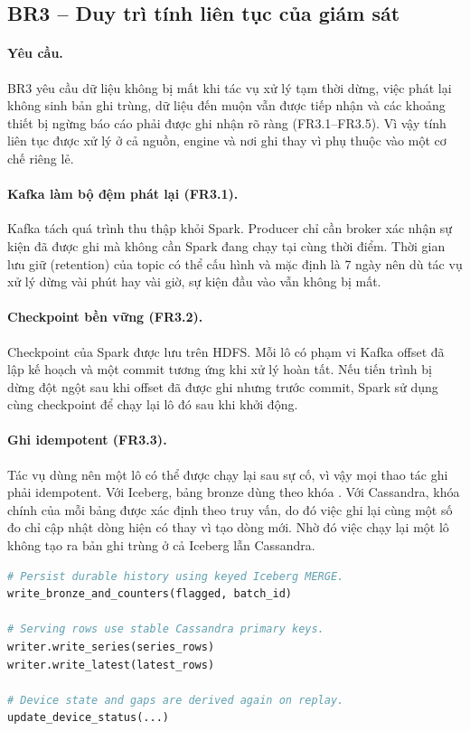 \subsection{BR3 -- Duy trì tính liên tục của giám sát}
\label{sec:4-br03}

\paragraph{Yêu cầu.}
BR3 yêu cầu dữ liệu không bị mất khi tác vụ xử lý tạm thời dừng, việc phát lại không sinh bản ghi trùng, dữ liệu đến muộn vẫn được tiếp nhận và các khoảng thiết bị ngừng báo cáo phải được ghi nhận rõ ràng (FR3.1--FR3.5). Vì vậy tính liên tục được xử lý ở cả nguồn, engine và nơi ghi thay vì phụ thuộc vào một cơ chế riêng lẻ.

\paragraph{Kafka làm bộ đệm phát lại (FR3.1).}
Kafka tách quá trình thu thập khỏi Spark. Producer chỉ cần broker xác nhận sự kiện đã được ghi mà không cần Spark đang chạy tại cùng thời điểm. Thời gian lưu giữ (retention) của topic có thể cấu hình và mặc định là 7 ngày nên dù tác vụ xử lý dừng vài phút hay vài giờ, sự kiện đầu vào vẫn không bị mất.

\paragraph{Checkpoint bền vững (FR3.2).}
Checkpoint của Spark được lưu trên HDFS. Mỗi lô có phạm vi Kafka offset đã lập kế hoạch và một commit tương ứng khi xử lý hoàn tất. Nếu tiến trình bị dừng đột ngột sau khi offset đã được ghi nhưng trước commit, Spark sử dụng cùng checkpoint để chạy lại lô đó sau khi khởi động.

\paragraph{Ghi idempotent (FR3.3).}
Tác vụ dùng  nên một lô có thể được chạy lại sau sự cố, vì vậy mọi thao tác ghi phải idempotent. Với Iceberg, bảng bronze dùng  theo khóa . Với Cassandra, khóa chính của mỗi bảng được xác định theo truy vấn, do đó việc ghi lại cùng một số đo chỉ cập nhật dòng hiện có thay vì tạo dòng mới. Nhờ đó việc chạy lại một lô không tạo ra bản ghi trùng ở cả Iceberg lẫn Cassandra.

\begin{lstlisting}[language=Python, caption={Các giai đoạn liên quan tới phục hồi của một micro-batch (rút gọn)}, label={lst:4-br03-batch}]
# Persist durable history using keyed Iceberg MERGE.
write_bronze_and_counters(flagged, batch_id)

# Serving rows use stable Cassandra primary keys.
writer.write_series(series_rows)
writer.write_latest(latest_rows)

# Device state and gaps are derived again on replay.
update_device_status(...)
\end{lstlisting}

